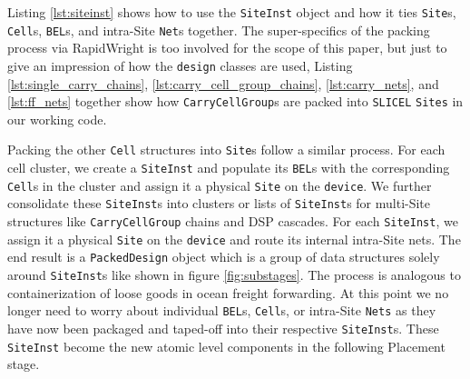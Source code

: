
Listing \ref{lst:siteinst} shows how to use the \texttt{SiteInst} object and how it ties \texttt{Site}s, \texttt{Cell}s, \texttt{BEL}s, and intra-Site \texttt{Net}s together. 
The super-specifics of the packing process via RapidWright is too involved for the scope of this paper, but just to give an impression of how the \texttt{design} classes are used, Listing \ref{lst:single_carry_chains}, \ref{lst:carry_cell_group_chains}, \ref{lst:carry_nets}, and \ref{lst:ff_nets} together show how \texttt{CarryCellGroup}s are packed into \texttt{SLICEL} \texttt{Sites} in our working code. 

Packing the other \texttt{Cell} structures into \texttt{Site}s follow a similar process. 
For each cell cluster, we create a \texttt{SiteInst} and populate its \texttt{BEL}s with the corresponding \texttt{Cell}s in the cluster and assign it a physical \texttt{Site} on the \texttt{device}.
We further consolidate these \texttt{SiteInst}s into clusters or lists of \texttt{SiteInst}s for multi-Site structures like \texttt{CarryCellGroup} chains and DSP cascades. 
For each \texttt{SiteInst}, we assign it a physical \texttt{Site} on the \texttt{device} and route its internal intra-Site nets. 
The end result is a \texttt{PackedDesign} object which is a group of data structures solely around \texttt{SiteInst}s like shown in figure \ref{fig:substages}.
The process is analogous to containerization of loose goods in ocean freight forwarding. 
At this point we no longer need to worry about individual \texttt{BEL}s, \texttt{Cell}s, or intra-Site \texttt{Nets} as they have now been packaged and taped-off into their respective \texttt{SiteInst}s. 
These \texttt{SiteInst} become the new atomic level components in the following Placement stage. 

